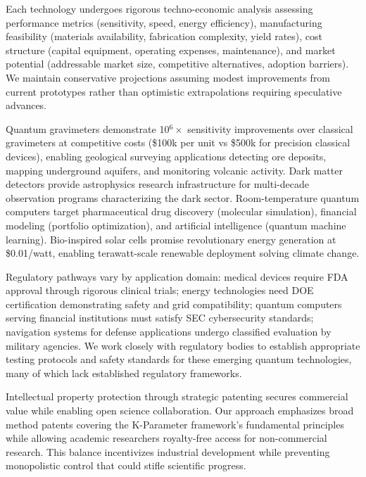 \documentclass[11pt,a4paper,twoside]{article}
\begin{document}
\begin{description}[leftmargin=*,style=nextline]
    Each technology undergoes rigorous techno-economic analysis assessing performance metrics (sensitivity, speed, energy efficiency), manufacturing feasibility (materials availability, fabrication complexity, yield rates), cost structure (capital equipment, operating expenses, maintenance), and market potential (addressable market size, competitive alternatives, adoption barriers). We maintain conservative projections assuming modest improvements from current prototypes rather than optimistic extrapolations requiring speculative advances.

    Quantum gravimeters demonstrate 10$^6\times$ sensitivity improvements over classical gravimeters at competitive costs (\$100k per unit vs \$500k for precision classical devices), enabling geological surveying applications detecting ore deposits, mapping underground aquifers, and monitoring volcanic activity. Dark matter detectors provide astrophysics research infrastructure for multi-decade observation programs characterizing the dark sector. Room-temperature quantum computers target pharmaceutical drug discovery (molecular simulation), financial modeling (portfolio optimization), and artificial intelligence (quantum machine learning). Bio-inspired solar cells promise revolutionary energy generation at \$0.01/watt, enabling terawatt-scale renewable deployment solving climate change.

    Regulatory pathways vary by application domain: medical devices require FDA approval through rigorous clinical trials; energy technologies need DOE certification demonstrating safety and grid compatibility; quantum computers serving financial institutions must satisfy SEC cybersecurity standards; navigation systems for defense applications undergo classified evaluation by military agencies. We work closely with regulatory bodies to establish appropriate testing protocols and safety standards for these emerging quantum technologies, many of which lack established regulatory frameworks.

    Intellectual property protection through strategic patenting secures commercial value while enabling open science collaboration. Our approach emphasizes broad method patents covering the K-Parameter framework's fundamental principles while allowing academic researchers royalty-free access for non-commercial research. This balance incentivizes industrial development while preventing monopolistic control that could stifle scientific progress.
\end{description}
\end{document}
